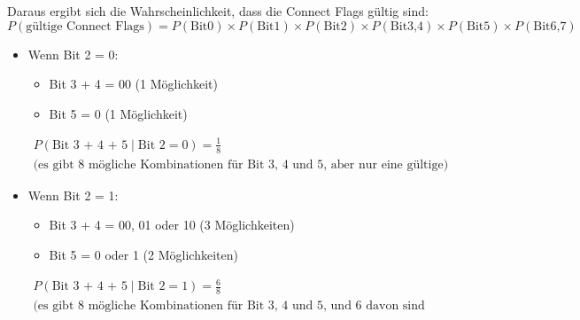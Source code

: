 Daraus ergibt sich die Wahrscheinlichkeit, dass die Connect Flags gültig sind:
\begin{equation}\label{eq:valid_connect_flags}
    P(\text{gültige Connect Flags}) = P(\text{Bit0}) \times P(\text{Bit1}) \times P(\text{Bit2}) \times P(\text{Bit3,4}) \times P(\text{Bit5}) \times P(\text{Bit6,7})
\end{equation}
\begin{itemize}
    \item Wenn Bit 2 = 0:

    \begin{itemize}
        \item Bit 3 + 4 = 00 (1 Möglichkeit)
        \item Bit 5 = 0 (1 Möglichkeit)
    \end{itemize}
\begin{multline}
    P(\text{Bit 3 + 4 + 5} \mid \text{Bit 2} = 0) = \frac{1}{8} \quad \\ \text{(es gibt 8 mögliche Kombinationen für Bit 3, 4 und 5, aber nur eine gültige)}
\end{multline}
    \item Wenn Bit 2 = 1:

    \begin{itemize}
        \item Bit 3 + 4 = 00, 01 oder 10 (3 Möglichkeiten)
        \item Bit 5 = 0 oder 1 (2 Möglichkeiten)
    \end{itemize}
\begin{multline}
    P(\text{Bit 3 + 4 + 5} \mid \text{Bit 2} = 1) = \frac{6}{8} \quad \\ \text{(es gibt 8 mögliche Kombinationen für Bit 3, 4 und 5, und 6 davon sind gültig)}
\end{multline}
\end{itemize}

